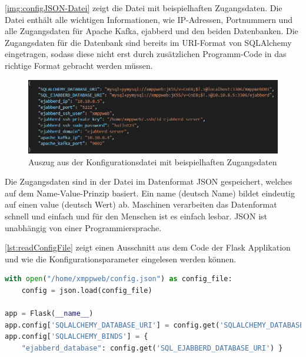 \documentclass[a4paper,titlepage,halfparskip,12pt]{scrreprt}
\begin{document}
\begin{onehalfspacing}
\autoref{img:configJSON-Datei} zeigt die Datei mit beispielhaften Zugangsdaten. Die Datei enthält alle wichtigen Informationen, wie IP-Adressen, Portnummern und alle Zugangsdaten für Apache Kafka, ejabberd und den beiden Datenbanken. Die Zugangsdaten für die Datenbank sind bereits im \acs{URI}-Format von SQLAlchemy eingetragen, sodass diese nicht erst durch zusätzlichen Programm-Code in das richtige Format gebracht werden müssen.

\begin{figure}[h]
	\centering
	\includegraphics[width=\linewidth]{images/configJSON-Datei}
	\caption{Auszug aus der Konfigurationsdatei mit beispielhaften Zugangsdaten}
	\label{img:configJSON-Datei}
\end{figure}

Die Zugangsdaten sind in der Datei im Datenformat \ac{JSON} gespeichert, welches auf dem Name-Value-Prinzip basiert. Ein name (deutsch Name) bildet eindeutig auf einen value (deutsch Wert) ab. Maschinen verarbeiten das Datenformat schnell und einfach und für den Menschen ist es einfach lesbar. \ac{JSON} ist unabhängig von einer Programmiersprache.\cite{jsonIntroduction}

\autoref{lst:readConfigFile} zeigt einen Ausschnitt aus dem Code der Flask Applikation und wie die Konfigurationsparameter eingelesen werden können.

\begin{lstlisting}[language=python, caption={Auslesen der Konfigurationsparameter aus einer Datei}, label={lst:readConfigFile}]
with open("/home/xmppweb/config.json") as config_file:
    config = json.load(config_file)

app = Flask(__name__)
app.config['SQLALCHEMY_DATABASE_URI'] = config.get('SQLALCHEMY_DATABASE_URI')
app.config['SQLALCHEMY_BINDS'] = {
    "ejabberd_database": config.get('SQL_EJABBERD_DATABASE_URI') }
\end{lstlisting}


\end{onehalfspacing}
\end{document}
